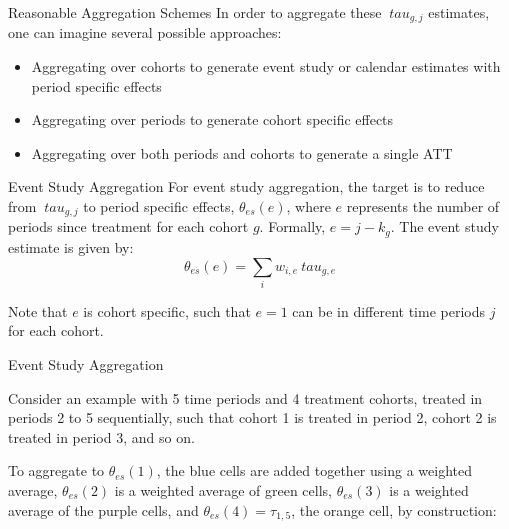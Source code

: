 \documentclass[11pt]{beamer}
\begin{document}
\begin{frame}{Reasonable Aggregation Schemes}
    In order to aggregate these $\ tau_{g,j}$ estimates, one can imagine several possible approaches:

    \begin{itemize}
        \item Aggregating over cohorts to generate event study or calendar estimates with period specific effects
        \item Aggregating over periods to generate cohort specific effects
        \item Aggregating over both periods and cohorts to generate a single ATT
    \end{itemize}
\end{frame}


\begin{frame}{Event Study Aggregation}
    For event study aggregation, the target is to reduce from $\ tau_{g,j}$ to period specific effects, $\theta_{es}(e)$, where $e$ represents the number of periods since treatment for each cohort $g$. Formally, $e = j - k_g$. The event study estimate is given by:
    \begin{equation}
        \theta_{es}(e) = \sum_i w_{i,e} \ tau_{g,e}
    \end{equation}

    Note that $e$ is cohort specific, such that $e = 1$ can be in different time periods $j$ for each cohort. 
\end{frame}

\begin{frame}{Event Study Aggregation}

    Consider an example with 5 time periods and 4 treatment cohorts, treated in periods 2 to 5 sequentially, such that cohort 1 is treated in period 2, cohort 2 is treated in period 3, and so on.

    \vspace{2.5mm}
    To aggregate to $\theta_{es}(1)$, the blue cells are added together using a weighted average, $\theta_{es}(2)$ is a weighted average of green cells, $\theta_{es}(3)$ is a weighted average of the purple cells, and $\theta_{es}(4) = \tau_{1,5}$, the orange cell, by construction:

    
\end{frame}
\end{document}
